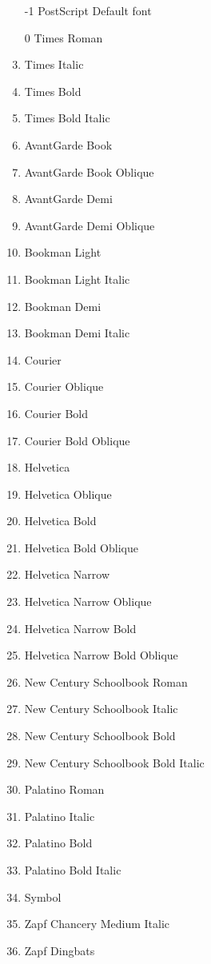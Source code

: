 \documentclass[10pt, a4paper]{article}%
\begin{document}
\begin{enumerate}
\item[-1] PostScript Default font
\item[0]  Times Roman
\item     Times Italic
\item     Times Bold
\item     Times Bold Italic
\item     AvantGarde Book
\item     AvantGarde Book Oblique
\item     AvantGarde Demi
\item     AvantGarde Demi Oblique
\item     Bookman Light
\item     Bookman Light Italic
\item     Bookman Demi
\item     Bookman Demi Italic
\item     Courier
\item     Courier Oblique
\item     Courier Bold
\item     Courier Bold Oblique
\item     Helvetica
\item     Helvetica Oblique
\item     Helvetica Bold
\item     Helvetica Bold Oblique
\item     Helvetica Narrow
\item     Helvetica Narrow Oblique
\item     Helvetica Narrow Bold
\item     Helvetica Narrow Bold Oblique
\item     New Century Schoolbook Roman
\item     New Century Schoolbook Italic
\item     New Century Schoolbook Bold
\item     New Century Schoolbook Bold Italic
\item     Palatino Roman
\item     Palatino Italic
\item     Palatino Bold
\item     Palatino Bold Italic
\item     Symbol
\item     Zapf Chancery Medium Italic
\item     Zapf Dingbats
\end{enumerate}
      
\end{document}

